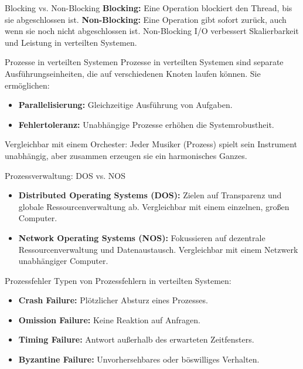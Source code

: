 \documentclass{beamer}
\begin{document}
\begin{frame}{Blocking vs. Non-Blocking}
    \textbf{Blocking:} Eine Operation blockiert den Thread, bis sie abgeschlossen ist. \newline
    \textbf{Non-Blocking:} Eine Operation gibt sofort zurück, auch wenn sie noch nicht abgeschlossen ist. \newline
    Non-Blocking I/O verbessert Skalierbarkeit und Leistung in verteilten Systemen.
\end{frame}

\begin{frame}{Prozesse in verteilten Systemen}
    Prozesse in verteilten Systemen sind separate Ausführungseinheiten, die auf verschiedenen Knoten laufen können. Sie ermöglichen:
    \begin{itemize}
        \item \textbf{Parallelisierung:} Gleichzeitige Ausführung von Aufgaben.
        \item \textbf{Fehlertoleranz:} Unabhängige Prozesse erhöhen die Systemrobustheit.
    \end{itemize}
    Vergleichbar mit einem Orchester: Jeder Musiker (Prozess) spielt sein Instrument unabhängig, aber zusammen erzeugen sie ein harmonisches Ganzes.
\end{frame}

\begin{frame}{Prozessverwaltung: DOS vs. NOS}
    \begin{itemize}
        \item \textbf{Distributed Operating Systems (DOS):} Zielen auf Transparenz und globale Ressourcenverwaltung ab. Vergleichbar mit einem einzelnen, großen Computer.
        \item \textbf{Network Operating Systems (NOS):} Fokussieren auf dezentrale Ressourcenverwaltung und Datenaustausch. Vergleichbar mit einem Netzwerk unabhängiger Computer.
    \end{itemize}
\end{frame}

\begin{frame}{Prozessfehler}
    Typen von Prozessfehlern in verteilten Systemen:
    \begin{itemize}
        \item \textbf{Crash Failure:} Plötzlicher Absturz eines Prozesses.
        \item \textbf{Omission Failure:} Keine Reaktion auf Anfragen.
        \item \textbf{Timing Failure:} Antwort außerhalb des erwarteten Zeitfensters.
        \item \textbf{Byzantine Failure:} Unvorhersehbares oder böswilliges Verhalten.
    \end{itemize}
\end{frame}
\end{document}
